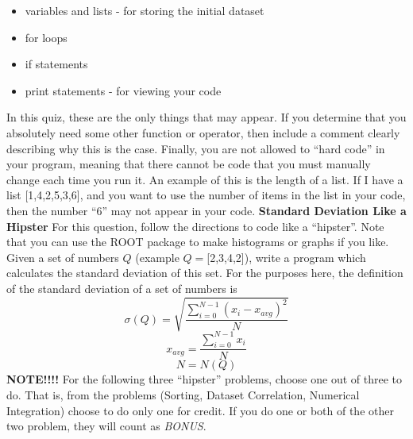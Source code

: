 \documentclass[12pt]{article}
\begin{document}
\begin{itemize}[noitemsep]
\item variables and lists - for storing the initial dataset
\item for loops
\item if statements
\item print statements - for viewing your code
\end{itemize}
In this quiz, these are the only things that may appear.   If you determine that you absolutely need some other function or operator, then include a comment clearly describing why this is the case.
\newline
\newline
Finally, you are not allowed to ``hard code'' in your program, meaning that there cannot be code that you must manually change each time you run it.  An example of this is the length of a list.  If I have a list [1,4,2,5,3,6], and you want to use the number of items in the list in your code, then the number ``6'' may not appear in your code.  
\newline
\newline
\newpage
\textbf{Standard Deviation Like a Hipster}
\newline
For this question, follow the directions to code like a ``hipster''.  Note that you can use the ROOT package to make histograms or graphs if you like.
\newline
\newline
Given a set of numbers $Q$ (example $Q=$[2,3,4,2]), write a program which calculates the standard deviation of this set.  For the purposes here, the definition of the standard deviation of a set of numbers is
\begin{displaymath}
\sigma(Q)=\sqrt{\frac{\displaystyle\sum_{i=0}^{N-1} (x_{i}-x_{avg})^2}{N}} 
\end{displaymath}
\begin{displaymath}
x_{avg}=\frac{\displaystyle\sum_{i=0}^{N-1} x_{i}}{N}
\end{displaymath}
\begin{displaymath}
N=N(Q)
\end{displaymath}
\newline
\textbf{NOTE!!!!}
\newline
For the following three ``hipster'' problems, choose one out of three to do.  That is, from the problems (Sorting, Dataset Correlation, Numerical Integration) choose to do only one for credit.  If you do one or both of the other two problem, they will count as \textit{BONUS}.
\end{document}
